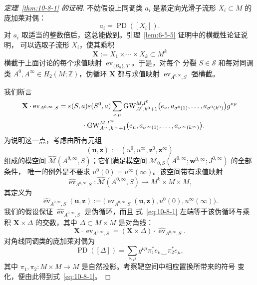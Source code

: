\begin{proof}[定理~\ref{thm:10-8-1} 的证明]
不妨假设上同调类 $a_i$ 是紧定向光滑子流形 $X_i\subset M$ 的庞加莱对偶：
\[
  a_i=\operatorname{PD}([X_i]).
\]
对 $a_i$ 取适当的整数倍后，这总能做到。引理~\ref{lem:6-5-5} 证明中的横截性论证说明，
可以选取子流形 $X_i$，使其乘积
\[
  \mathbf X:=X_1\times\cdots\times X_k\subset M^k
\]
横截于上面讨论的每个求值映射 $\operatorname{ev}_{\{B_\alpha\},T}$。于是，对每个
分裂 $S\in\mathcal S$ 和每对同调类
$A^0,A^\infty\in H_2(M;\mathbb Z)$，伪循环 $\mathbf X$ 都与求值映射
$\operatorname{ev}_{A^{0,\infty},S}$ 强横截。

我们断言
\begin{align}
  \mathbf X\mathbin{\cdot}\operatorname{ev}_{A^{0,\infty},S}
  ={}&\varepsilon(S,a)\varepsilon(S^0,a)\sum_{\nu,\mu}
  \operatorname{GW}_{A^0,k^0+1}^{M,I^0}
  \bigl(e_\nu,a_{\sigma^0(1)},\ldots,a_{\sigma^0(k^0)}\bigr)
  g^{\nu\mu}\notag\\
  &\qquad{}\cdot
  \operatorname{GW}_{A^\infty,k^\infty+1}^{M,I^\infty}
  \bigl(e_\mu,a_{\sigma^\infty(1)},\ldots,
  a_{\sigma^\infty(k^\infty)}\bigr).
  \label{eq:10-8-1}
\end{align}
为说明这一点，考虑由所有元组
\[
  (\mathbf u,\mathbf z):=(u^0,u^\infty,\mathbf z^0,\mathbf z^\infty)
\]
组成的模空间 $\widehat{\mathcal M}(A^{0,\infty},S)$；它们满足模空间
$\mathcal M_{0,S}(A^{0,\infty};\mathbf w^{0,\infty};J^{0,\infty})$ 的全部条件，
唯一的例外是不要求 $u^0(0)=u^\infty(\infty)$。该空间带有求值映射
\[
  \widehat{\operatorname{ev}}_{A^{0,\infty},S}:
  \widehat{\mathcal M}(A^{0,\infty},S)
  \longrightarrow M^k\times M\times M,
\]
其定义为
\[
  \widehat{\operatorname{ev}}_{A^{0,\infty},S}(\mathbf u,\mathbf z)
  :=\bigl(\operatorname{ev}_{A^{0,\infty},S}(\mathbf u,\mathbf z),
  u^0(0),u^\infty(\infty)\bigr).
\]
我们的假设保证 $\widehat{\operatorname{ev}}_{A^{0,\infty},S}$ 是伪循环，而且
式~\eqref{eq:10-8-1} 左端等于该伪循环与乘积 $\mathbf X\times\Delta$ 的交数，其中
$\Delta\subset M\times M$ 是对角线：
\[
  \mathbf X\mathbin{\cdot}\operatorname{ev}_{A^{0,\infty},S}
  =(\mathbf X\times\Delta)\mathbin{\cdot}
  \widehat{\operatorname{ev}}_{A^{0,\infty},S}.
\]
对角线同调类的庞加莱对偶为
\begin{equation}\label{eq:10-8-2}
  \operatorname{PD}([\Delta])
  =\sum_{\nu,\mu}g^{\nu\mu}\pi_1^*e_\nu\smile\pi_2^*e_\mu,
\end{equation}
其中 $\pi_1,\pi_2:M\times M\to M$ 是自然投影。考察靶空间中相应置换所带来的符号
变化，便由此得到式~\eqref{eq:10-8-1}。


\end{proof}
